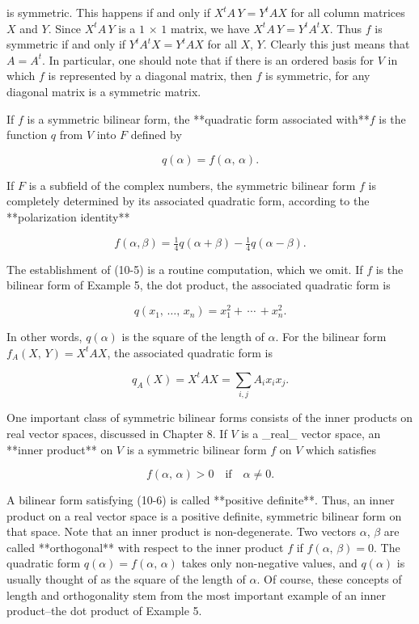 is symmetric. This happens if and only if \(X^{t}A\,Y=Y^{t}AX\) for all column matrices \(X\) and \(Y\). Since \(X^{t}A\,Y\) is a \(1\,\times\,1\) matrix, we have \(X^{t}A\,Y=Y^{t}A^{t}X\). Thus \(f\) is symmetric if and only if \(Y^{t}A^{t}X=Y^{t}AX\) for all \(X\), \(Y\). Clearly this just means that \(A=A^{t}\). In particular, one should note that if there is an ordered basis for \(V\) in which \(f\) is represented by a diagonal matrix, then \(f\) is symmetric, for any diagonal matrix is a symmetric matrix.

If \(f\) is a symmetric bilinear form, the **quadratic form associated with**\(f\) is the function \(q\) from \(V\) into \(F\) defined by

\[q(\alpha)=f(\alpha,\,\alpha).\]

If \(F\) is a subfield of the complex numbers, the symmetric bilinear form \(f\) is completely determined by its associated quadratic form, according to the **polarization identity**

\[f(\alpha,\beta)=\tfrac{1}{4}q(\alpha+\beta)-\tfrac{1}{4}q(\alpha-\beta).\]

The establishment of (10-5) is a routine computation, which we omit. If \(f\) is the bilinear form of Example 5, the dot product, the associated quadratic form is

\[q(x_{1},\,\ldots,\,x_{n})=x_{1}^{2}+\,\cdots\,+x_{n}^{2}.\]

In other words, \(q(\alpha)\) is the square of the length of \(\alpha\). For the bilinear form \(f_{A}(X,\,Y)=X^{t}AX\), the associated quadratic form is

\[q_{A}(X)=X^{t}AX=\sum_{i,j}A_{i}x_{i}x_{j}.\]

One important class of symmetric bilinear forms consists of the inner products on real vector spaces, discussed in Chapter 8. If \(V\) is a _real_ vector space, an **inner product** on \(V\) is a symmetric bilinear form \(f\) on \(V\) which satisfies

\[f(\alpha,\,\alpha)>0\quad\text{if}\quad\alpha\neq 0.\]

A bilinear form satisfying (10-6) is called **positive definite**. Thus, an inner product on a real vector space is a positive definite, symmetric bilinear form on that space. Note that an inner product is non-degenerate. Two vectors \(\alpha\), \(\beta\) are called **orthogonal** with respect to the inner product \(f\) if \(f(\alpha,\,\beta)=0\). The quadratic form \(q(\alpha)=f(\alpha,\,\alpha)\) takes only non-negative values, and \(q(\alpha)\) is usually thought of as the square of the length of \(\alpha\). Of course, these concepts of length and orthogonality stem from the most important example of an inner product--the dot product of Example 5.

